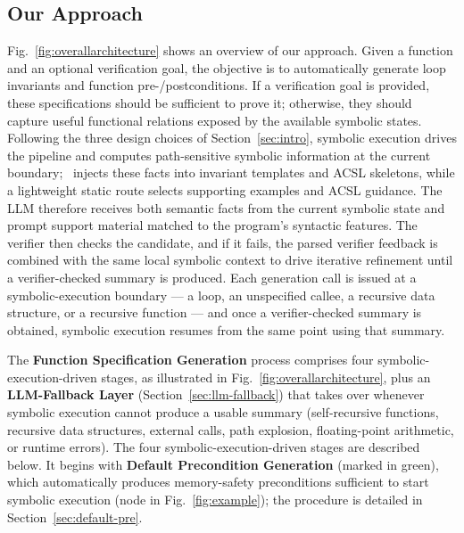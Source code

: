 \subsection{Our Approach} 




Fig.~\ref{fig:overallarchitecture} shows an overview of our approach. Given a function and an optional verification goal, the objective is to automatically generate loop invariants and function pre-/postconditions. If a verification goal is provided, these specifications should be sufficient to prove it; otherwise, they should capture useful functional relations exposed by the available symbolic states.
Following the three design choices of Section~\ref{sec:intro}, symbolic execution drives the pipeline and computes path-sensitive symbolic information at the current boundary; \toolname\ injects these facts into invariant templates and ACSL skeletons, while a lightweight static route selects supporting examples and ACSL guidance. The LLM therefore receives both semantic facts from the current symbolic state and prompt support material matched to the program's syntactic features. The verifier then checks the candidate, and if it fails, the parsed verifier feedback is combined with the same local symbolic context to drive iterative refinement until a verifier-checked summary is produced. Each generation call is issued at a symbolic-execution boundary --- a loop, an unspecified callee, a recursive data structure, or a recursive function --- and once a verifier-checked summary is obtained, symbolic execution resumes from the same point using that summary.

 

 
The \textbf{Function Specification Generation} process comprises four symbolic-execution-driven stages, as illustrated in Fig.~\ref{fig:overallarchitecture}, plus an \textbf{LLM-Fallback Layer} (Section~\ref{sec:llm-fallback}) that takes over whenever symbolic execution cannot produce a usable summary (self-recursive functions, recursive data structures, external calls, path explosion, floating-point arithmetic, or runtime errors). The four symbolic-execution-driven stages are described below. It begins with \textbf{Default Precondition Generation} (marked in green), which automatically produces memory-safety preconditions sufficient to start symbolic execution (node  in Fig.~\ref{fig:example}); the procedure is detailed in Section~\ref{sec:default-pre}.
 

